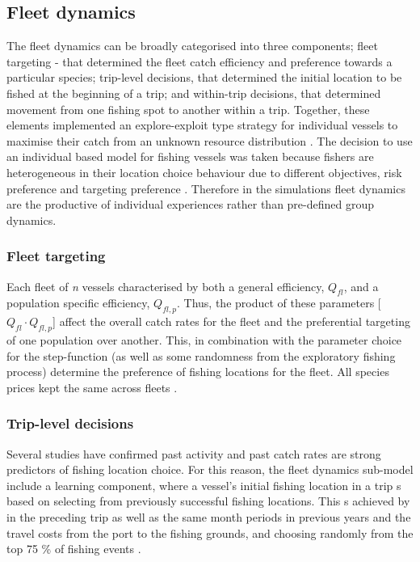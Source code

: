 \documentclass[review]{elsarticle}
\begin{document}
\subsection{Fleet dynamics}

The fleet dynamics can be broadly categorised into three components; fleet
targeting - that determined the fleet catch efficiency and preference towards a
particular species; trip-level decisions, that determined the initial location
to be fished at the beginning of a trip; and within-trip decisions, that
determined movement from one fishing spot to another within a trip. Together,
these elements implemented an explore-exploit type strategy for individual
vessels to maximise their catch from an unknown resource distribution
\cite{Bailey2018}.  The decision to use an individual based model for fishing
vessels was taken because fishers are heterogeneous in their location choice
behaviour due to different objectives, risk preference and targeting preference
\citep{VanPutten2012a}. Therefore in the simulations fleet dynamics are the
productive of individual experiences rather than pre-defined group dynamics. 

\subsubsection{Fleet targeting}

Each fleet of \textit{n} vessels  characterised by
both a general efficiency, $Q_{fl}$, and a population specific efficiency,
${Q_{fl, p}}$.  Thus, the product of these parameters [$Q_{fl} \cdot Q_{fl,
	p}$] affect the overall catch rates for the
fleet and the preferential targeting of one population over another. This, in
combination with the parameter choice for the step-function
 (as well as some randomness from the exploratory
fishing process) determine the preference of fishing
locations for the fleet.  All species prices  kept
the same across fleets .  

\subsubsection{Trip-level decisions}

Several studies \citep[e.g.][]{Hutton2004, Tidd2012, Girardin2015} have
confirmed past activity and past catch rates are strong predictors of fishing
location choice. For this reason, the fleet dynamics sub-model
include a learning component, where a vessel's initial
fishing location in a trip s based on selecting from
previously successful fishing locations. This s achieved
by  in the preceding trip as well as the same month
periods in previous years and the travel costs from the port to the fishing
grounds, and choosing randomly from the top 75 \% of fishing events
. 
\end{document}
